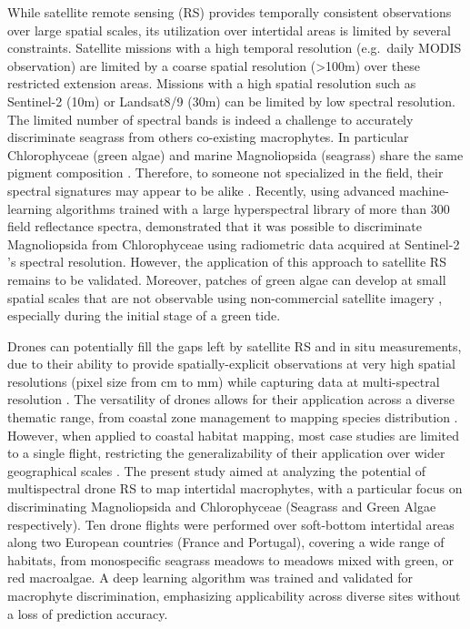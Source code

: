 \documentclass[
  number]{elsarticle}
\begin{document}
While satellite remote sensing (RS) provides temporally consistent
observations over large spatial scales, its utilization over intertidal
areas is limited by several constraints. Satellite missions with a high
temporal resolution (e.g.~daily MODIS observation) are limited by a
coarse spatial resolution (\textgreater100m) over these restricted
extension areas. Missions with a high spatial resolution such as
Sentinel-2 (10m) or Landsat8/9 (30m) can be limited by low spectral
resolution. The limited number of spectral bands is indeed a challenge
to accurately discriminate seagrass from others co-existing macrophytes.
In particular Chlorophyceae (green algae) and marine Magnoliopsida
(seagrass) share the same pigment composition \citetext{\citealp[
]{ralph2002}; \citealp{Douay2022}}. Therefore, to someone not
specialized in the field, their spectral signatures may appear to be
alike \citetext{\citealp[ ]{Davies2023}; \citealp{bannari2022}}.
Recently, using advanced machine-learning algorithms trained with a
large hyperspectral library of more than 300 field reflectance spectra,
\citep{Davies2023} demonstrated that it was possible to discriminate
Magnoliopsida from Chlorophyceae using radiometric data acquired at
Sentinel-2 's spectral resolution. However, the application of this
approach to satellite RS remains to be validated. Moreover, patches of
green algae can develop at small spatial scales that are not observable
using non-commercial satellite imagery \citep{tuya2013}, especially
during the initial stage of a green tide.

Drones can potentially fill the gaps left by satellite RS and in situ
measurements, due to their ability to provide spatially-explicit
observations at very high spatial resolutions (pixel size from cm to mm)
while capturing data at multi-spectral resolution \citetext{\citealp[
]{fairley2022drone}; \citealp{oh2017use}}. The versatility of drones
allows for their application across a diverse thematic range, from
coastal zone management \citetext{\citealp[ ]{adade2021}; \citealp[
]{casella2020}; \citealp{angnuureng2022}} to mapping species
distribution \citetext{\citealp[ ]{joyce2023}; \citealp[
]{tallam2023}; \citealp[ ]{Roca2022}; \citealp[
]{Roman2021}; \citealp{Brunier2022Topographic}}. However, when applied
to coastal habitat mapping, most case studies are limited to a single
flight, restricting the generalizability of their application over wider
geographical scales \citetext{\citealp[ ]{Roman2021}; \citealp[
]{collin2019improving}; \citealp[
]{rossiter2020uav}; \citealp{Brunier2022Topographic}}. The present study
aimed at analyzing the potential of multispectral drone RS to map
intertidal macrophytes, with a particular focus on discriminating
Magnoliopsida and Chlorophyceae (Seagrass and Green Algae respectively).
Ten drone flights were performed over soft-bottom intertidal areas along
two European countries (France and Portugal), covering a wide range of
habitats, from monospecific seagrass meadows to meadows mixed with
green, or red macroalgae. A deep learning algorithm was trained and
validated for macrophyte discrimination, emphasizing applicability
across diverse sites without a loss of prediction accuracy.
\end{document}
